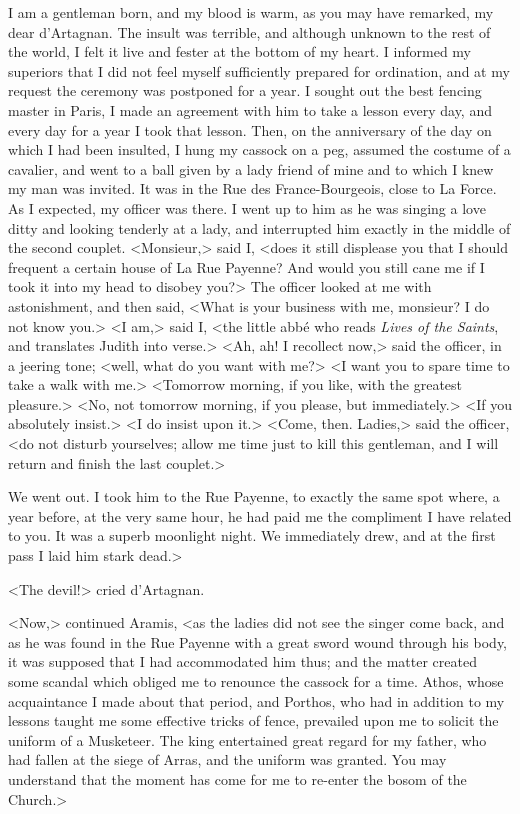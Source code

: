 I am a gentleman born, and my blood is warm, as you may have remarked, my dear d'Artagnan. The insult was terrible, and although unknown to the rest of the world, I felt it live and fester at the bottom of my heart. I informed my superiors that I did not feel myself sufficiently prepared for ordination, and at my request the ceremony was postponed for a year. I sought out the best fencing master in Paris, I made an agreement with him to take a lesson every day, and every day for a year I took that lesson. Then, on the anniversary of the day on which I had been insulted, I hung my cassock on a peg, assumed the costume of a cavalier, and went to a ball given by a lady friend of mine and to which I knew my man was invited. It was in the Rue des France-Bourgeois, close to La Force. As I expected, my officer was there. I went up to him as he was singing a love ditty and looking tenderly at a lady, and interrupted him exactly in the middle of the second couplet. <Monsieur,> said I, <does it still displease you that I should frequent a certain house of La Rue Payenne? And would you still cane me if I took it into my head to disobey you?> The officer looked at me with astonishment, and then said, <What is your business with me, monsieur? I do not know you.> <I am,> said I, <the little abbé who reads \textit{Lives of the Saints}, and translates Judith into verse.> <Ah, ah! I recollect now,> said the officer, in a jeering tone; <well, what do you want with me?> <I want you to spare time to take a walk with me.> <Tomorrow morning, if you like, with the greatest pleasure.> <No, not tomorrow morning, if you please, but immediately.> <If you absolutely insist.> <I do insist upon it.> <Come, then. Ladies,> said the officer, <do not disturb yourselves; allow me time just to kill this gentleman, and I will return and finish the last couplet.> 

We went out. I took him to the Rue Payenne, to exactly the same spot where, a year before, at the very same hour, he had paid me the compliment I have related to you. It was a superb moonlight night. We immediately drew, and at the first pass I laid him stark dead.> 

<The devil!> cried d'Artagnan. 

<Now,> continued Aramis, <as the ladies did not see the singer come back, and as he was found in the Rue Payenne with a great sword wound through his body, it was supposed that I had accommodated him thus; and the matter created some scandal which obliged me to renounce the cassock for a time. Athos, whose acquaintance I made about that period, and Porthos, who had in addition to my lessons taught me some effective tricks of fence, prevailed upon me to solicit the uniform of a Musketeer. The king entertained great regard for my father, who had fallen at the siege of Arras, and the uniform was granted. You may understand that the moment has come for me to re-enter the bosom of the Church.> 

